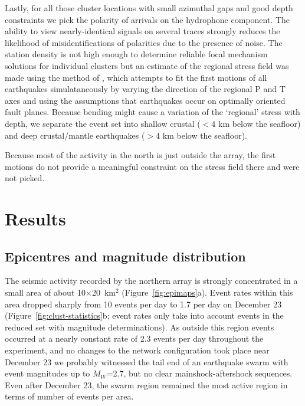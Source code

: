 \documentclass[reviewcopy]{elsart}
\begin{document}
Lastly, for all those cluster locations 
with small azimuthal
gaps and good depth constraints we pick the polarity of arrivals on the hydrophone
component. The ability to view nearly-identical signals on several
traces strongly reduces the likelihood of misidentifications of
polarities due to the presence of noise. The station density is not
high enough to determine reliable focal mechanism solutions for
individual clusters but an estimate of the regional stress field was
made using the method of \citet{robinson00}, which attempts to fit the
first motions of all earthquakes simulataneously by varying the
direction of the regional P and T axes and using the assumptions that earthquakes
occur on optimally oriented fault planes.  Because bending might cause
a variation of the `regional' stress with depth, we separate the event set
into shallow crustal ($<$4 km below the seafloor) and deep
crustal/mantle earthquakes ($>$4 km below the seafloor).

Because most of the activity in the north is just outside the array,
the first motions do not provide a meaningful constraint on the
stress field there and were not picked.

\section{Results}

\subsection{Epicentres and magnitude distribution}

The seismic activity recorded by the northern array is strongly
concentrated in a small area of about 10$\times$20~km$^2$
(Figure~\ref{fig:epimaps}a).  Event
rates within this area dropped sharply from 10 events per day to 1.7 per
day on December
23 (Figure~\ref{fig:clust-statistics}b; event rates only take into account events in the reduced set with
magnitude
determinations).  As outside this region events occurred at  a nearly constant rate of
2.3 events per day throughout the experiment, and no  changes to the network configuration took
place near December 23 we probably witnessed the tail end of an
earthquake swarm with event magnitudes up to $M_W$=2.7, but no clear
mainshock-aftershock sequences.   Even after December 23, the swarm
region remained the most active region in terms of number of events per
area.
\end{document}
